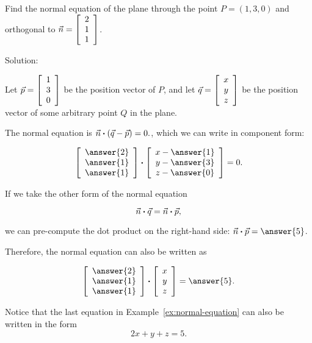 \documentclass{ximera}
\begin{document}
\begin{example}\label{ex:normal-equation}

  Find the normal equation of the plane through the point $P=(1,3,0)$
  and orthogonal to $\vect{n}=\startmat{c}2\\1\\1\stopmat$.

  Solution:

  Let $\vect{p}=\startmat{c}1\\3\\0\stopmat$ be the position vector of $P$, and let
  $\vect{q}=\startmat{c}x\\y\\z\stopmat$ be the position vector of some arbitrary
  point $Q$ in the plane. 
  
  The normal equation is
  $\vect{n} \dotprod (\vec{q}-\vect{p}) = 0.$, which we
  can write in component form:

  \begin{equation*}
    \startmat{c}\answer{2}\\\answer{1}\\\answer{1}\stopmat
    \dotprod
    \startmat{c}x-\answer{1}\\y-\answer{3}\\z-\answer{0}\stopmat
    =0.
  \end{equation*}

  If we take the other form of the normal equation 
  
  $$\vect{n} \dotprod \vect{q} = \vect{n} \dotprod \vect{p},$$
  
  we can pre-compute the dot product on the right-hand side:
  $\vect{n} \dotprod \vect{p} = \answer{5}$. 
  
  Therefore, the
  normal equation can also be written as

  \begin{equation*}
    \startmat{c}\answer{2}\\\answer{1}\\\answer{1}\stopmat
    \dotprod
    \startmat{c}x\\y\\z\stopmat
    = \answer{5}.
  \end{equation*}
\end{example}

Notice that the last equation in Example~\ref{ex:normal-equation} can
also be written in the form
\begin{equation*}
  2x + y + z = 5.
\end{equation*}
\end{document}
